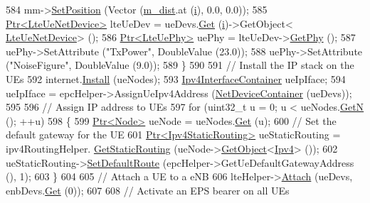 \begin{DoxyCode}
584       mm->\hyperlink{classns3_1_1MobilityModel_ac584b3d5a309709d2f13ed6ada1e7640}{SetPosition} (Vector (\hyperlink{classLenaCqaFfMacSchedulerTestCase2_a8d0cd5c486d9a7fa2581dbe5ca8e6997}{m\_dist}.at (\hyperlink{bernuolliDistribution_8m_a6f6ccfcf58b31cb6412107d9d5281426}{i}), 0.0, 0.0));
585       \hyperlink{classns3_1_1Ptr}{Ptr<LteUeNetDevice>} lteUeDev = ueDevs.\hyperlink{classns3_1_1NetDeviceContainer_a677d62594b5c9d2dea155cc5045f4d0b}{Get} (\hyperlink{bernuolliDistribution_8m_a6f6ccfcf58b31cb6412107d9d5281426}{i})->GetObject<
      \hyperlink{classns3_1_1LteUeNetDevice}{LteUeNetDevice}> ();
586       \hyperlink{classns3_1_1Ptr}{Ptr<LteUePhy>} uePhy = lteUeDev->\hyperlink{classns3_1_1LteUeNetDevice_a2a9940a1e457a8bf3dae87fed4199c7a}{GetPhy} ();
587       uePhy->SetAttribute (\textcolor{stringliteral}{"TxPower"}, DoubleValue (23.0));
588       uePhy->SetAttribute (\textcolor{stringliteral}{"NoiseFigure"}, DoubleValue (9.0));
589     \}
590 
591   \textcolor{comment}{// Install the IP stack on the UEs}
592   internet.\hyperlink{classns3_1_1InternetStackHelper_a6645b412f31283d2d9bc3d8a95cebbc0}{Install} (ueNodes);
593   \hyperlink{classns3_1_1Ipv4InterfaceContainer}{Ipv4InterfaceContainer} ueIpIface;
594   ueIpIface = epcHelper->AssignUeIpv4Address (\hyperlink{classns3_1_1NetDeviceContainer}{NetDeviceContainer} (ueDevs));
595 
596   \textcolor{comment}{// Assign IP address to UEs}
597   \textcolor{keywordflow}{for} (uint32\_t u = 0; u < ueNodes.\hyperlink{classns3_1_1NodeContainer_aed647ac56d0407a7706aba02eb44b951}{GetN} (); ++u)
598     \{
599       \hyperlink{classns3_1_1Ptr}{Ptr<Node>} ueNode = ueNodes.\hyperlink{classns3_1_1NodeContainer_a9ed96e2ecc22e0f5a3d4842eb9bf90bf}{Get} (u);
600       \textcolor{comment}{// Set the default gateway for the UE}
601       \hyperlink{classns3_1_1Ptr}{Ptr<Ipv4StaticRouting>} ueStaticRouting = ipv4RoutingHelper.
      \hyperlink{classns3_1_1Ipv4StaticRoutingHelper_a731206e50d305695dac7fb2ef963a4bb}{GetStaticRouting} (ueNode->\hyperlink{classns3_1_1Object_a13e18c00017096c8381eb651d5bd0783}{GetObject}<\hyperlink{classns3_1_1Ipv4}{Ipv4}> ());
602       ueStaticRouting->\hyperlink{classns3_1_1Ipv4StaticRouting_aee30fa3246c2b42f122dabdff2725331}{SetDefaultRoute} (epcHelper->GetUeDefaultGatewayAddress (), 1);
603     \}
604 
605   \textcolor{comment}{// Attach a UE to a eNB}
606   lteHelper->\hyperlink{classns3_1_1LteHelper_a9466743f826aa2652a87907b7f0a1c87}{Attach} (ueDevs, enbDevs.\hyperlink{classns3_1_1NetDeviceContainer_a677d62594b5c9d2dea155cc5045f4d0b}{Get} (0));
607 
608   \textcolor{comment}{// Activate an EPS bearer on all UEs}

\end{DoxyCode}
